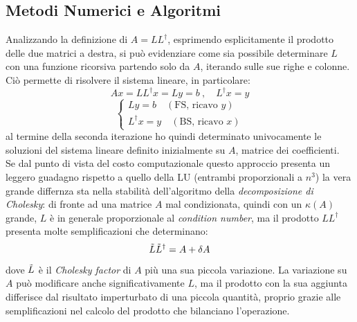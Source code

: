 \subsection{Metodi Numerici e Algoritmi}
Analizzando la definizione di $A=LL^\dagger$, esprimendo esplicitamente il prodotto delle due matrici a destra, si può evidenziare come sia possibile determinare $L$ con una funzione ricorsiva partendo solo da $A$, iterando sulle sue righe e colonne. Ciò permette di risolvere il sistema lineare, in particolare:
\[
Ax = LL^\dagger x = Ly = b\ , \quad L^\dagger x = y
\]
\[
\begin{cases}
    Ly = b \quad (\text{FS, ricavo $y$})\\
    L^\dagger x = y \quad (\text{BS, ricavo $x$})
\end{cases}
\]
al termine della seconda iterazione ho quindi determinato univocamente le soluzioni del sistema lineare definito inizialmente su $A$, matrice dei coefficienti.
\\
Se dal punto di vista del costo computazionale questo approccio presenta un leggero guadagno rispetto a quello della LU (entrambi proporzionali a $n^3$) la vera grande differnza sta nella stabilità dell'algoritmo della \textit{decomposizione di Cholesky}: di fronte ad una matrice $A$ mal condizionata, quindi con un $\kappa(A)$ grande, $L$ è in generale proporzionale al \textit{condition number}, ma il prodotto $LL^\dagger$ presenta molte semplificazioni che determinano:
\[
\Tilde{L}\Tilde{L}^\dagger = A + \delta A
\]
dove $\Tilde{L}$ è il \textit{Cholesky factor} di $A$ più una sua piccola variazione. La variazione su $A$ può modificare anche significativamente $L$, ma il prodotto con la sua aggiunta differisce dal risultato imperturbato di una piccola quantità, proprio grazie alle semplificazioni nel calcolo del prodotto che bilanciano l'operazione.

